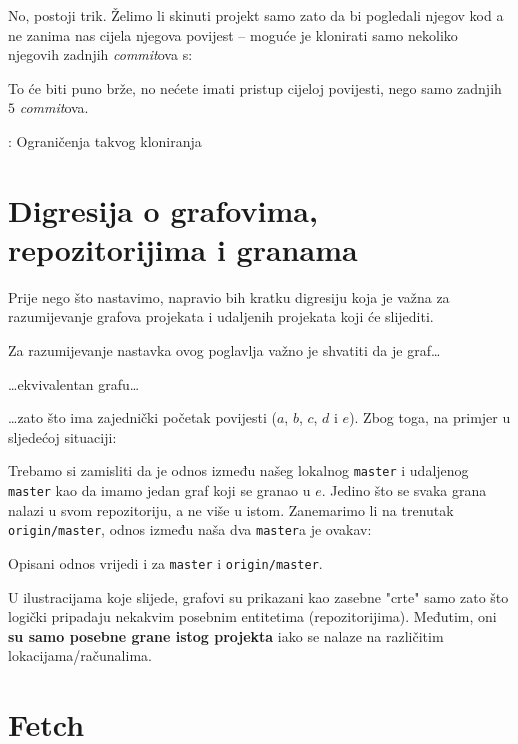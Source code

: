 No, postoji trik.
Želimo li skinuti projekt samo zato da bi pogledali njegov kod a ne zanima nas cijela njegova povijest -- moguće je klonirati samo nekoliko njegovih zadnjih \emph{commit}ova s:


To će biti puno brže, no nećete imati pristup cijeloj povijesti, nego samo zadnjih $5$ \emph{commit}ova.

\TODO: Ograničenja takvog kloniranja

\section*{Digresija o grafovima, repozitorijima i granama}

Prije nego što nastavimo, napravio bih kratku digresiju koja je važna za razumijevanje grafova projekata i udaljenih projekata koji će slijediti.

Za razumijevanje nastavka ovog poglavlja važno je shvatiti da je graf\dots



\dots{}ekvivalentan grafu\dots



\dots{}zato što ima zajednički početak povijesti ($a$, $b$, $c$, $d$ i $e$).
Zbog toga, na primjer u sljedećoj situaciji:



Trebamo si zamisliti da je odnos između našeg lokalnog \verb+master+ i udaljenog \verb+master+ kao da imamo jedan graf koji se granao u $e$. Jedino što se svaka grana nalazi u svom repozitoriju, a ne više u istom.
Zanemarimo li na trenutak \verb+origin/master+, odnos između naša dva \verb+master+a je ovakav:



Opisani odnos vrijedi i za \verb+master+ i \verb+origin/master+.

U ilustracijama koje slijede, grafovi su prikazani kao zasebne "crte" samo zato što logički pripadaju nekakvim posebnim entitetima (repozitorijima).
Međutim, oni \textbf{su samo posebne grane istog projekta} iako se nalaze na različitim lokacijama/računalima.

\section*{Fetch}


